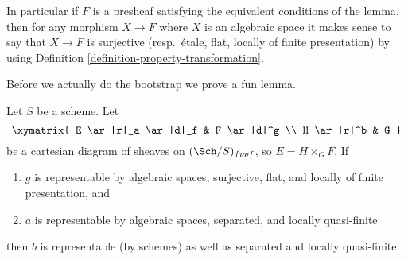 \noindent
In particular if $F$ is a presheaf satisfying the equivalent conditions of
the lemma, then for any morphism $X \to F$ where $X$ is an algebraic space
it makes sense to say that $X \to F$ is surjective (resp.\ \'etale, flat,
locally of finite presentation) by using
Definition \ref{definition-property-transformation}.

\medskip\noindent
Before we actually do the bootstrap we prove a fun lemma.

\begin{lemma}
\label{lemma-after-fppf-sep-lqf}
Let $S$ be a scheme.
Let
$$
\xymatrix{
E \ar[r]_a \ar[d]_f & F \ar[d]^g \\
H \ar[r]^b & G
}
$$
be a cartesian diagram of sheaves on $(\Sch/S)_{fppf}$, so
$E = H \times_G F$. If
\begin{enumerate}
\item $g$ is representable by algebraic spaces, surjective, flat, and
locally of finite presentation, and
\item $a$ is representable by algebraic spaces, separated, and
locally quasi-finite
\end{enumerate}
then $b$ is representable (by schemes) as well as separated and
locally quasi-finite.
\end{lemma}

